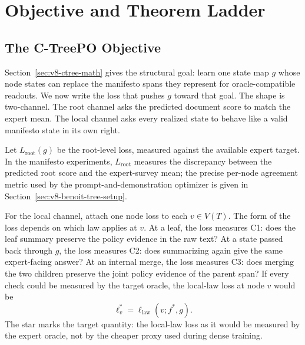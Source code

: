 \section{Objective and Theorem Ladder}
\label{sec:v8-objective}
\label{sec:v8-theorem-ladder}

\subsection{The C-TreePO Objective}

Section~\ref{sec:v8-ctree-math} gives the structural goal: learn one
state map \(g\) whose node states can replace the manifesto spans they
represent for oracle-compatible readouts. We now write the loss that
pushes \(g\) toward that goal. The shape is two-channel. The root
channel asks the predicted document score to match the expert mean.
The local channel asks every realized state to behave like a valid
manifesto state in its own right.

Let \(L_{\mathrm{root}}(g)\) be the root-level loss, measured against
the available expert target. In the manifesto experiments,
\(L_{\mathrm{root}}\) measures the discrepancy between the predicted
root score and the expert-survey mean; the precise per-node agreement
metric used by the prompt-and-demonstration optimizer is given in
Section~\ref{sec:v8-benoit-tree-setup}.

For the local channel, attach one node loss to each \(v\in V(T)\).
The form of the loss depends on which law applies at \(v\). At a
leaf, the loss measures C1: does the leaf summary preserve the policy
evidence in the raw text? At a state passed back through \(g\), the
loss measures C2: does summarizing again give the same expert-facing
answer? At an internal merge, the loss measures C3: does merging the
two children preserve the joint policy evidence of the parent span?
If every check could be measured by the target oracle, the local-law
loss at node \(v\) would be
\[
  \ell_v^\ast
  =
  \ell_{\mathrm{law}}(v;f^\ast,g).
\]
The star marks the target quantity: the local-law loss as it would be
measured by the expert oracle, not by the cheaper proxy used during
dense training.

